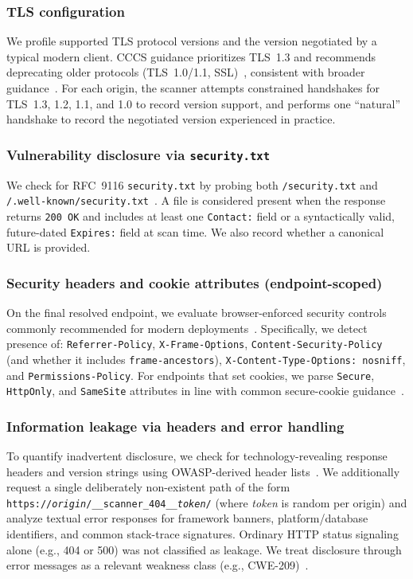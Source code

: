 \documentclass[conference]{IEEEtran}
\begin{document}
\subsubsection{TLS configuration}
  We profile supported TLS protocol versions and the version negotiated by a typical modern client. CCCS guidance prioritizes TLS~1.3 and recommends deprecating older protocols (TLS~1.0/1.1, SSL)~\cite{cccs-itsap-40016,cccs-itsp-40062}, consistent with broader guidance~\cite{nist_800_52r2,nsa_eliminating_obsolete_tls}. For each origin, the scanner attempts constrained handshakes for TLS~1.3, 1.2, 1.1, and 1.0 to record version support, and performs one ``natural'' handshake to record the negotiated version experienced in practice.

\subsubsection{Vulnerability disclosure via \texttt{security.txt}}
We check for RFC~9116 \texttt{security.txt} by probing both \texttt{/security.txt} and \texttt{/.well-known/security.txt}~\cite{rfc9116}. A file is considered present when the response returns \texttt{200 OK} and includes at least one \texttt{Contact:} field or a syntactically valid, future-dated \texttt{Expires:} field at scan time. We also record whether a canonical URL is provided.

\subsubsection{Security headers and cookie attributes (endpoint-scoped)}
On the final resolved endpoint, we evaluate browser-enforced security controls commonly recommended for modern deployments~\cite{owasp_http_security_response_headers,chrome_permissions_policy,gds_security_overview_websites}. Specifically, we detect presence of: \texttt{Referrer-Policy}, \texttt{X-Frame-Options}, \texttt{Content-Security-Policy} (and whether it includes \texttt{frame-ancestors}), \texttt{X-Content-Type-Options: nosniff}, and \texttt{Permissions-Policy}. For endpoints that set cookies, we parse \texttt{Secure}, \texttt{HttpOnly}, and \texttt{SameSite} attributes in line with common secure-cookie guidance~\cite{mdn_secure_cookie_configuration,cccs_itsp_40_111}.

\subsubsection{Information leakage via headers and error handling}
To quantify inadvertent disclosure, we check for technology-revealing response headers and version strings using OWASP-derived header
lists~\cite{owasp_secure_headers_project,owasp_secure_headers_remove_json}. 
We additionally request a single deliberately non-existent path of the form
\texttt{https://\textit{origin}/\_\_scanner\_404\_\_\textit{token}/}
(where \textit{token} is random per origin) and analyze textual error responses for framework banners, 
platform/database identifiers, and common stack-trace signatures. Ordinary HTTP status signaling alone (e.g., 404 or 500) was
 not classified as leakage. We treat disclosure through error messages as a relevant weakness class (e.g., CWE-209)~\cite{cwe_209}.
\end{document}
